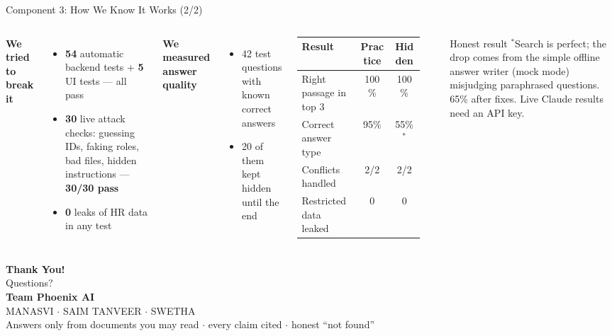 \documentclass[aspectratio=169,11pt]{beamer}
\begin{document}
\begin{frame}{Component 3: How We Know It Works \hfill{\normalsize\color{white}(2/2)}}
  \begin{columns}[T]
      \textbf{We tried to break it}
      \begin{itemize}\small
        \item \textbf{54} automatic backend tests + \textbf{5} UI tests --- all pass
        \item \textbf{30} live attack checks: guessing IDs, faking roles, bad files, hidden instructions --- \textbf{30/30 pass}
        \item \textbf{0} leaks of HR data in any test
      \end{itemize}
      \textbf{We measured answer quality}
      \begin{itemize}\small
        \item 42 test questions with known correct answers
        \item 20 of them kept hidden until the end
      \end{itemize}
      \small
      \begin{tabular}{@{}lcc@{}}
        \toprule
        \textbf{Result} & \textbf{Practice} & \textbf{Hidden} \\
        \midrule
        Right passage in top 3 & 100\% & 100\% \\
        Correct answer type & 95\% & 55\%$^{*}$ \\
        Conflicts handled & 2/2 & 2/2 \\
        Restricted data leaked & 0 & 0 \\
        \bottomrule
      \end{tabular}\\[0.4em]
      \begin{alertblock}{Honest result}\scriptsize
        $^{*}$Search is perfect; the drop comes from the simple offline answer writer (mock mode) misjudging
        paraphrased questions. 65\% after fixes. Live Claude results need an API key.
      \end{alertblock}
  \end{columns}
\end{frame}

\begin{frame}[plain]
  \centering
  \vspace{2.2em}
  {\Huge\bfseries\color{phoenix} Thank You!}\\[1.2em]
  {\Large Questions?}\\[2em]
  {\large\textbf{Team Phoenix AI}}\\[0.4em]
  MANASVI \quad $\cdot$ \quad SAIM TANVEER \quad $\cdot$ \quad SWETHA\\[1.5em]
  {\small\color{gray} Answers only from documents you may read \;$\cdot$\; every claim cited \;$\cdot$\;
  honest ``not found''}
\end{frame}
\end{document}
